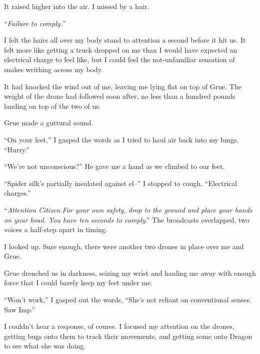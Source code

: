 It raised higher into the air.  I missed by a hair.



``\emph{Failure to comply.''}



I felt the hairs all over my body stand to attention a second before it hit us.  It felt more like getting a truck dropped on me than I would have expected an electrical charge to feel like, but I could feel the not-unfamiliar sensation of snakes writhing across my body.



It had knocked the wind out of me, leaving me lying flat on top of Grue.  The weight of the drone had followed soon after, no less than a hundred pounds landing on top of the two of us.



Grue made a guttural sound.



``On your feet,'' I gasped the words as I tried to haul air back into my lungs.  ``Hurry.''



``We're not unconscious?''  He gave me a hand as we climbed to our feet.



``Spider silk's partially insulated against el--'' I stopped to cough.  ``Electrical charges.''



``\emph{Attention Citizen.}\emph{For your own safety, drop to the ground and place your hands on your head.  You have ten seconds to comply}.''  The broadcasts overlapped, two voices a half-step apart in timing.



I looked up.  Sure enough, there were another two drones in place over me and Grue.



Grue drenched us in darkness, seizing my wrist and hauling me away with enough force that I could barely keep my feet under me.



``Won't work,'' I gasped out the words, ``She's not reliant on conventional senses.  Saw Imp.''



I couldn't hear a response, of course.  I focused my attention on the drones, getting bugs onto them to track their movements, and getting some onto Dragon to see what she was doing.



